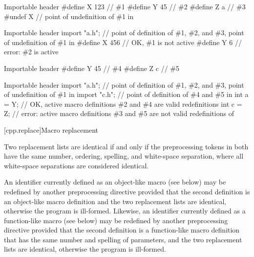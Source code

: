\pnum
\begin{example}
\begin{codeblocktu}{Importable header }
#define X 123   // \#1
#define Y 45    // \#2
#define Z a     // \#3
#undef X        // point of undefinition of \#1 in 
\end{codeblocktu}

\begin{codeblocktu}{Importable header }
import "a.h";   // point of definition of \#1, \#2, and \#3, point of undefinition of \#1 in 
#define X 456   // OK, \#1 is not active
#define Y 6     // error: \#2 is active
\end{codeblocktu}

\begin{codeblocktu}{Importable header }
#define Y 45    // \#4
#define Z c     // \#5
\end{codeblocktu}

\begin{codeblocktu}{Importable header }
import "a.h";   // point of definition of \#1, \#2, and \#3, point of undefinition of \#1 in 
import "c.h";   // point of definition of \#4 and \#5 in 
int a = Y;      // OK, active macro definitions \#2 and \#4 are valid redefinitions
int c = Z;      // error: active macro definitions \#3 and \#5 are not valid redefinitions of 
\end{codeblocktu}
\end{example}

[cpp.replace]{Macro replacement}%
%
%

\pnum
{}%
Two replacement lists are identical if and only if
the preprocessing tokens in both have
the same number, ordering, spelling, and white-space separation,
where all white-space separations are considered identical.

\pnum
An identifier currently defined as an
%
object-like macro (see below) may be redefined by another
preprocessing directive provided that the second definition is an
object-like macro definition and the two replacement lists
are identical, otherwise the program is ill-formed.
Likewise, an identifier currently defined as a
%
function-like macro (see below) may be redefined by another
preprocessing directive provided that the second definition is a
function-like macro definition that has the same number and spelling
of parameters,
and the two replacement lists are identical,
otherwise the program is ill-formed.

